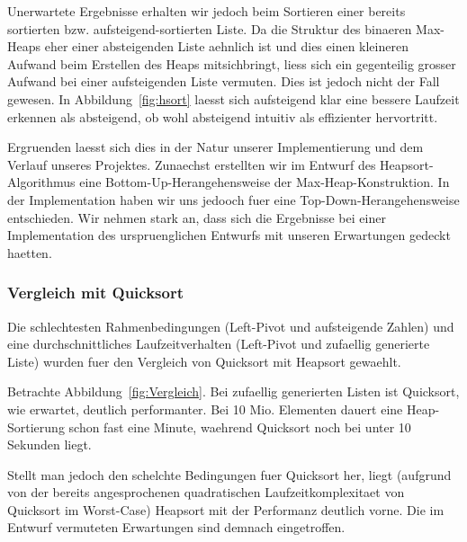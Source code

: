 Unerwartete Ergebnisse erhalten wir jedoch beim Sortieren einer bereits sortierten bzw. aufsteigend-sortierten Liste.
Da die Struktur des binaeren Max-Heaps eher einer absteigenden Liste aehnlich ist und dies einen kleineren Aufwand beim Erstellen des Heaps mitsichbringt, liess sich ein gegenteilig grosser Aufwand bei einer aufsteigenden Liste vermuten.
Dies ist jedoch nicht der Fall gewesen.
In Abbildung~\ref{fig:hsort} laesst sich aufsteigend klar eine bessere Laufzeit erkennen als absteigend, ob wohl absteigend intuitiv als effizienter hervortritt.

Ergruenden laesst sich dies in der Natur unserer Implementierung und dem Verlauf unseres Projektes.
Zunaechst erstellten wir im Entwurf des Heapsort-Algorithmus eine Bottom-Up-Herangehensweise der Max-Heap-Konstruktion.
In der Implementation haben wir uns jedooch fuer eine Top-Down-Herangehensweise entschieden.
Wir nehmen stark an, dass sich die Ergebnisse bei einer Implementation des urspruenglichen Entwurfs mit unseren Erwartungen gedeckt haetten.


\subsubsection{Vergleich mit Quicksort}\label{subsec:Vergleich mit Quicksort}

Die schlechtesten Rahmenbedingungen (Left-Pivot und aufsteigende Zahlen) und eine durchschnittliches Laufzeitverhalten (Left-Pivot und zufaellig generierte Liste) wurden fuer den Vergleich von Quicksort mit Heapsort gewaehlt.

Betrachte Abbildung~\ref{fig:Vergleich}.
Bei zufaellig generierten Listen ist Quicksort, wie erwartet, deutlich performanter.
Bei 10 Mio. Elementen dauert eine Heap-Sortierung schon fast eine Minute, waehrend Quicksort noch bei unter 10 Sekunden liegt.

Stellt man jedoch den schelchte Bedingungen fuer Quicksort her, liegt (aufgrund von der bereits angesprochenen quadratischen Laufzeitkomplexitaet von Quicksort im Worst-Case) Heapsort mit der Performanz deutlich vorne. Die im Entwurf vermuteten Erwartungen sind demnach eingetroffen. 



